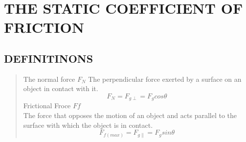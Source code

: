 \documentclass{article}
\begin{document}
\section*{THE STATIC COEFFICIENT OF FRICTION}
\subsection*{DEFINITINONS}
\begin{quote}
The normal force $F_N$
The perpendicular force exerted by a surface on an object in contact with it.
\begin{equation}
F_N = F_{g\perp} = F_g cos \theta  
\end{equation}
Frictional Froce $F f$ \\
The force that opposes the motion of an object and acts parallel to the surface with which the object is in contact.
\begin{equation}
F_{f(max)} = F_{g\parallel} = F_g sin \theta
\end{equation}
\end{quote}

\subsection*{}
\end{document}
